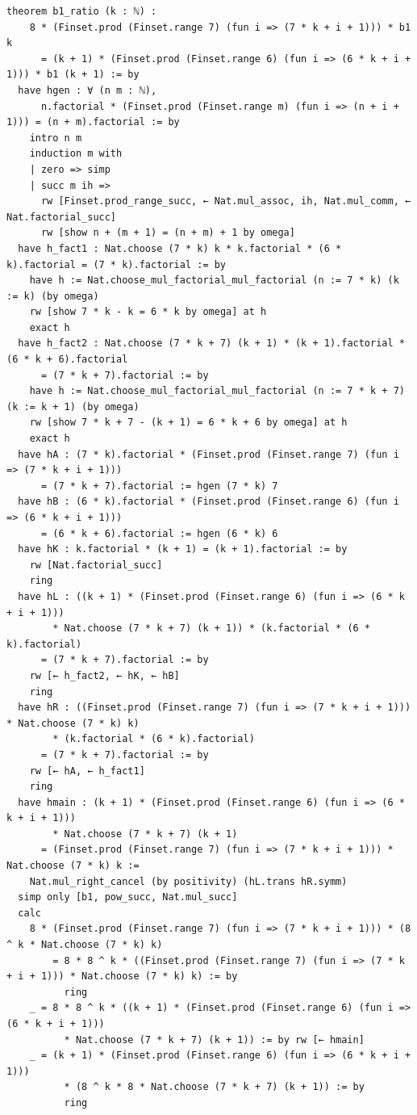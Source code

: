 \documentclass[11pt]{article}
\begin{document}
\begin{lstlisting}[caption={Complete proof, verbatim from \texttt{final/01-half3-proved.lean} (118 lines, sha256 \texttt{69375553}...).},label={lst:proof}]
theorem b1_ratio (k : ℕ) :
    8 * (Finset.prod (Finset.range 7) (fun i => (7 * k + i + 1))) * b1 k
      = (k + 1) * (Finset.prod (Finset.range 6) (fun i => (6 * k + i + 1))) * b1 (k + 1) := by
  have hgen : ∀ (n m : ℕ),
      n.factorial * (Finset.prod (Finset.range m) (fun i => (n + i + 1))) = (n + m).factorial := by
    intro n m
    induction m with
    | zero => simp
    | succ m ih =>
      rw [Finset.prod_range_succ, ← Nat.mul_assoc, ih, Nat.mul_comm, ← Nat.factorial_succ]
      rw [show n + (m + 1) = (n + m) + 1 by omega]
  have h_fact1 : Nat.choose (7 * k) k * k.factorial * (6 * k).factorial = (7 * k).factorial := by
    have h := Nat.choose_mul_factorial_mul_factorial (n := 7 * k) (k := k) (by omega)
    rw [show 7 * k - k = 6 * k by omega] at h
    exact h
  have h_fact2 : Nat.choose (7 * k + 7) (k + 1) * (k + 1).factorial * (6 * k + 6).factorial
      = (7 * k + 7).factorial := by
    have h := Nat.choose_mul_factorial_mul_factorial (n := 7 * k + 7) (k := k + 1) (by omega)
    rw [show 7 * k + 7 - (k + 1) = 6 * k + 6 by omega] at h
    exact h
  have hA : (7 * k).factorial * (Finset.prod (Finset.range 7) (fun i => (7 * k + i + 1)))
      = (7 * k + 7).factorial := hgen (7 * k) 7
  have hB : (6 * k).factorial * (Finset.prod (Finset.range 6) (fun i => (6 * k + i + 1)))
      = (6 * k + 6).factorial := hgen (6 * k) 6
  have hK : k.factorial * (k + 1) = (k + 1).factorial := by
    rw [Nat.factorial_succ]
    ring
  have hL : ((k + 1) * (Finset.prod (Finset.range 6) (fun i => (6 * k + i + 1)))
        * Nat.choose (7 * k + 7) (k + 1)) * (k.factorial * (6 * k).factorial)
      = (7 * k + 7).factorial := by
    rw [← h_fact2, ← hK, ← hB]
    ring
  have hR : ((Finset.prod (Finset.range 7) (fun i => (7 * k + i + 1))) * Nat.choose (7 * k) k)
        * (k.factorial * (6 * k).factorial)
      = (7 * k + 7).factorial := by
    rw [← hA, ← h_fact1]
    ring
  have hmain : (k + 1) * (Finset.prod (Finset.range 6) (fun i => (6 * k + i + 1)))
        * Nat.choose (7 * k + 7) (k + 1)
      = (Finset.prod (Finset.range 7) (fun i => (7 * k + i + 1))) * Nat.choose (7 * k) k :=
    Nat.mul_right_cancel (by positivity) (hL.trans hR.symm)
  simp only [b1, pow_succ, Nat.mul_succ]
  calc
    8 * (Finset.prod (Finset.range 7) (fun i => (7 * k + i + 1))) * (8 ^ k * Nat.choose (7 * k) k)
        = 8 * 8 ^ k * ((Finset.prod (Finset.range 7) (fun i => (7 * k + i + 1))) * Nat.choose (7 * k) k) := by
          ring
    _ = 8 * 8 ^ k * ((k + 1) * (Finset.prod (Finset.range 6) (fun i => (6 * k + i + 1)))
          * Nat.choose (7 * k + 7) (k + 1)) := by rw [← hmain]
    _ = (k + 1) * (Finset.prod (Finset.range 6) (fun i => (6 * k + i + 1)))
          * (8 ^ k * 8 * Nat.choose (7 * k + 7) (k + 1)) := by
          ring
\end{lstlisting}
\end{document}
